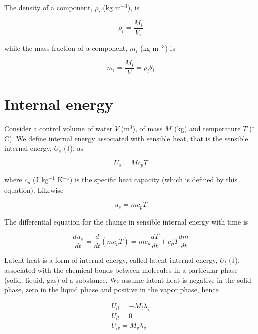 \documentclass[10pt,a4paper]{article}
\begin{document}
The density of a component, $\rho_i$ (kg m$^{-3}$), is

\begin{equation}
	\rho_i=\frac{M_i}{V_i}
\end{equation}

while the mass fraction of a component, $m_i$ (kg m$^{-3}$) is

\begin{equation}
	m_i=\frac{M_i}{V}=\rho_i\theta_i
\end{equation}

\section{Internal energy}

Consider a control volume of water $V$ (m$^3$), of mass $M$ (kg) and temperature $T$ ($^\circ$C). We define internal energy associated with sensible heat, that is the sensible internal energy, $U_s$ (J), as 

\begin{equation}
U_s=M c_pT
\end{equation}

where $c_p$ (J kg$^{-1}$ K$^{-1}$) is the specific heat capacity (which is defined by this equation). Likewise


\begin{equation} \label{eq: SH}
u_s=m c_pT
\end{equation}

The differential equation for the change in sensible internal energy with time is

\begin{equation}
\frac{du_s}{dt}=\frac{d}{dt}(m c_p T)=m c_p \frac{dT}{dt} + c_p T \frac{dm}{dt}
\end{equation}

Latent heat is a form of internal energy, called latent internal energy, $U_l$ (J), associated with the chemical bonds between molecules in a particular phase (solid, liquid, gas) of a substance. We assume latent heat is negative in the solid phase, zero in the liquid phase and positive in the vapor phase, hence

\begin{equation}
	\begin{array}{c}
	U_{li}=-M_i\lambda_f
	\\
	U_{ll}=0
	\\
	U_{lv}=M_v\lambda_v
	\end{array}
\end{equation}
\end{document}
